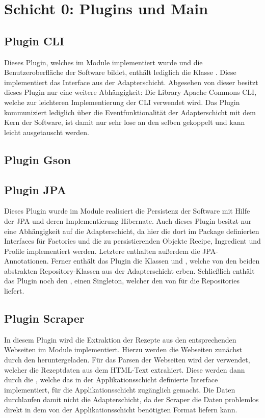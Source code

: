 \section{Schicht 0: Plugins und Main}

\subsection{Plugin \acs{CLI}}
Dieses Plugin, welches im Module  implementiert wurde und die Benutzeroberfläche der Software bildet, enthält lediglich die Klasse . Diese implementiert das Interface  aus der Adapterschicht. Abgesehen von dieser besitzt dieses Plugin nur eine weitere Abhängigkeit: Die Library Apache Commons \acs{CLI}, welche zur leichteren Implementierung der \ac{CLI} verwendet wird. Das Plugin kommuniziert lediglich über die Eventfunktionalität der Adapterschicht mit dem Kern der Software, ist damit nur sehr lose an den selben gekoppelt und kann leicht ausgetauscht werden.

\subsection{Plugin Gson}

\subsection{Plugin JPA}
Dieses Plugin wurde im Module  realisiert die Persistenz der Software mit Hilfe der \ac{JPA} und deren Implementierung Hibernate. Auch dieses Plugin besitzt nur eine Abhängigkeit auf die Adapterschicht, da hier die dort im Package  definierten Interfaces für Factories und die zu persistierenden Objekte Recipe, Ingredient und Profile implementiert werden. Letztere enthalten außerdem die \ac{JPA}-Annotationen. Ferner enthält das Plugin die Klassen  und , welche von den beiden abstrakten Repository-Klassen aus der Adapterschicht erben. Schließlich enthält das Plugin noch den , einen Singleton, welcher den  von  für die Repositories liefert.

\subsection{Plugin Scraper}
In diesem Plugin wird die Extraktion der Rezepte aus den entsprechenden Webseiten im Module  implementiert. Hierzu werden die Webseiten zunächst durch den  heruntergeladen. Für das Parsen der Webseiten wird der  verwendet, welcher die Rezeptdaten aus dem HTML-Text extrahiert. Diese werden dann durch die , welche das in der Applikationsschicht definierte Interface  implementiert, für die Applikationsschicht zugänglich gemacht. Die Daten durchlaufen damit nicht die Adapterschicht, da der Scraper die Daten problemlos direkt in dem von der Applikationsschicht benötigten Format liefern kann.

